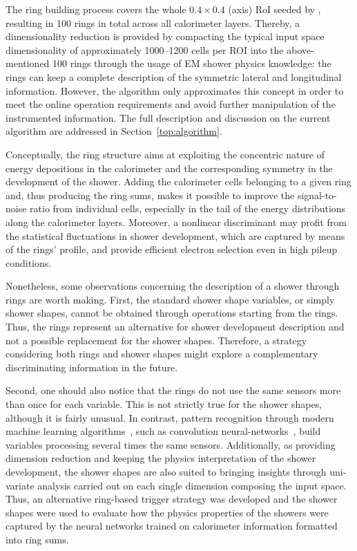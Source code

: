 The ring building process covers the whole $0.4\times0.4$ (\etaphi axis) RoI
seeded by \licalo, resulting in 100 rings in total across all calorimeter layers.
Thereby, a dimensionality reduction is provided by compacting the
typical input space dimensionality of approximately 1000--1200 cells per ROI into
the above-mentioned 100 rings through the usage of EM shower physics knowledge: the rings can keep a complete description of the symmetric lateral and
longitudinal information. However, the algorithm only approximates this concept
in order to meet the online operation requirements and avoid further
manipulation of the instrumented information. The full description and
discussion on the current algorithm are addressed in
Section~\ref{top:algorithm}.



Conceptually, the ring structure aims at exploiting the concentric nature of energy depositions in the calorimeter and the corresponding symmetry in the development of the shower.  Adding the calorimeter cells belonging to a given ring and, thus producing the ring sums, makes it possible to improve the signal-to-noise ratio from individual cells, especially in the tail of the energy distributions along the calorimeter layers.  Moreover, a nonlinear discriminant may profit from the statistical fluctuations in shower development, which are captured by means of the rings' profile, and provide efficient electron selection even in high pileup conditions.

Nonetheless, some observations concerning the description of a shower through rings are worth making. First, the standard shower shape variables, or simply shower shapes, cannot be obtained through operations starting from the rings.  Thus, the rings represent an alternative for shower development description and not a possible replacement for the shower shapes.  Therefore, a strategy considering both rings and shower shapes might explore a complementary discriminating information in the future.



Second, one should also notice
that the rings do not use the same sensors more than once for each variable.
This is not strictly true for the shower shapes, although it is fairly unusual.
In contrast, pattern recognition through modern machine learning
algorithms~\cite{Engelbrecht2007,Goodfellow2016}, such as convolution
neural-networks~\cite{Gu2018}, build variables processing several times
the same sensors. Additionally, as providing dimension reduction and keeping the physics interpretation of the shower development, the shower shapes are also suited to bringing insights through uni-variate analysis carried out on each
single dimension composing the input space.
Thus, an alternative ring-based trigger strategy was developed and the shower shapes were used to evaluate how the physics properties of the showers were captured by the neural networks trained on calorimeter information formatted into ring sums. 



